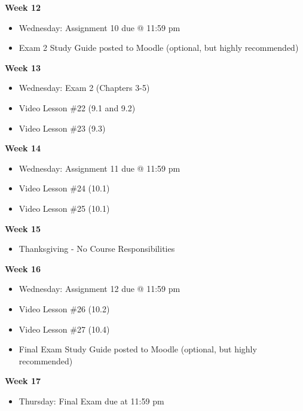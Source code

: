 \documentclass[12pt]{letter}
\newcommand{\?}{\stackrel{?}{=}}
\begin{document}
	\textbf{Week 12} \begin{itemize} \vspace{-12pt}
		\item Wednesday: Assignment 10 due @ 11:59 pm
		\item Exam 2 Study Guide posted to Moodle (optional, but highly recommended)
	\end{itemize}

	\textbf{Week 13} \begin{itemize} \vspace{-12pt}
		\item Wednesday: Exam 2 (Chapters 3-5)
		\item Video Lesson \#22 (9.1 and 9.2)
		\item Video Lesson \#23 (9.3)
	\end{itemize}

	\textbf{Week 14} \begin{itemize} \vspace{-12pt}
		\item Wednesday: Assignment 11 due @ 11:59 pm
		\item Video Lesson \#24 (10.1)
		\item Video Lesson \#25 (10.1)
	\end{itemize}

	\textbf{Week 15} \begin{itemize} \vspace{-12pt}
		\item Thanksgiving - No Course Responsibilities
	\end{itemize}

	\textbf{Week 16} \begin{itemize} \vspace{-12pt}
		\item Wednesday: Assignment 12 due @ 11:59 pm
		\item Video Lesson \#26 (10.2)
		\item Video Lesson \#27 (10.4)
		\item Final Exam Study Guide posted to Moodle (optional, but highly recommended)
	\end{itemize}

	\textbf{Week 17} \begin{itemize} \vspace{-12pt}
		\item Thursday: Final Exam due at 11:59 pm
	\end{itemize}
\end{document}
